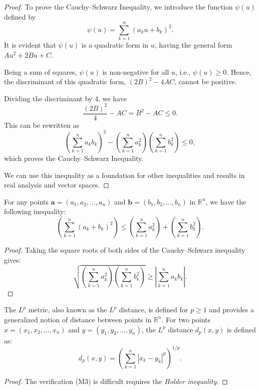 \begin{proof}
    To prove the Cauchy--Schwarz Inequality, we introduce the function \( \psi(u) \) defined by
    \[
    \psi(u) = \sum_{k=1}^{n} \left(a_k u + b_k\right)^2.
    \]
    It is evident that \( \psi(u) \) is a quadratic form in \( u \), having the general form \( Au^2 + 2Bu + C \).
    
    Being a sum of squares, \( \psi(u) \) is non-negative for all \( u \), i.e., \( \psi(u) \geq 0 \). Hence, the discriminant of this quadratic form, \( (2B)^2 - 4AC \), cannot be positive. 
    
    Dividing the discriminant by 4, we have
    \[
    \frac{(2B)^2}{4} - AC = B^2 - AC \leq 0.
    \]
    This can be rewritten as
    \[
    \left(\sum_{k=1}^{n} a_k b_k\right)^2 - \left(\sum_{k=1}^{n} a_k^2\right)\left(\sum_{k=1}^{n} b_k^2\right) \leq 0,
    \]
    which proves the Cauchy--Schwarz Inequality.
    
    We can use this inequality as a foundation for other inequalities and results in real analysis and vector spaces.
    
\end{proof}

\begin{theorem}
    For any points \( \mathbf{a} = (a_1, a_2, \ldots, a_n) \) and \( \mathbf{b} = (b_1, b_2, \ldots, b_n) \) in \( \mathbb{R}^n \), we have the following inequality:
    \[
    \left( \sum_{k=1}^{n} (a_k + b_k)^2 \right) \leq \left( \sum_{k=1}^{n} a_k^2 \right) + \left( \sum_{k=1}^{n} b_k^2 \right).
    \]
\end{theorem}
\begin{proof}
    Taking the square roots of both sides of the Cauchy--Schwarz inequality gives:
    \[
    \sqrt{\left( \sum_{k=1}^{n} a_k^2 \right) \left( \sum_{k=1}^{n} b_k^2 \right)} \geq \left| \sum_{k=1}^{n} a_k b_k \right|.
    \]
\end{proof}

\begin{example}[$l^{p}$-metric on $\RR^n$]
    The \( L^p \) metric, also known as the \( L^p \) distance, is defined for \( p \geq 1 \) and provides a generalized notion of distance between points in \( \mathbb{R}^n \). For two points \( x = (x_1, x_2, \ldots, x_n) \) and \( y = (y_1, y_2, \ldots, y_n) \), the \( L^p \) distance \( d_p(x, y) \) is defined as:
    \[
    d_p(x, y) = \left( \sum_{k=1}^{n} |x_k - y_k|^p \right)^{1/p}.
    \]
\end{example}
\begin{proof}
    The verification (M3) is difficult requires the \textit{Holder inequality}.
\end{proof}


